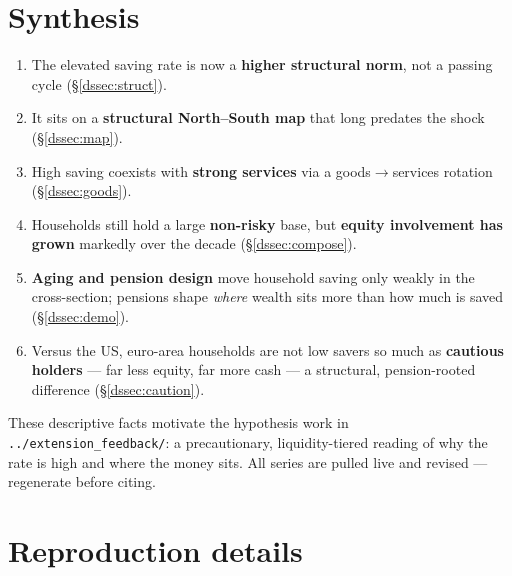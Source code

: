 \documentclass[11pt,a4paper]{article}
\newcommand{\code}[1]{\texttt{#1}}
\begin{document}
\section{Synthesis}\label{dssec:synth}
\begin{enumerate}[label=\arabic*.]
  \item The elevated saving rate is now a \textbf{higher structural norm}, not a
  passing cycle (\S\ref{dssec:struct}).
  \item It sits on a \textbf{structural North--South map} that long predates the
  shock (\S\ref{dssec:map}).
  \item High saving coexists with \textbf{strong services} via a
  goods$\rightarrow$services rotation (\S\ref{dssec:goods}).
  \item Households still hold a large \textbf{non-risky} base, but \textbf{equity
  involvement has grown} markedly over the decade (\S\ref{dssec:compose}).
  \item \textbf{Aging and pension design} move household saving only weakly in the
  cross-section; pensions shape \emph{where} wealth sits more than how much is saved
  (\S\ref{dssec:demo}).
  \item Versus the US, euro-area households are not low savers so much as
  \textbf{cautious holders} --- far less equity, far more cash --- a structural,
  pension-rooted difference (\S\ref{dssec:caution}).
\end{enumerate}
These descriptive facts motivate the hypothesis work in
\code{../extension\_feedback/}: a precautionary, liquidity-tiered reading of why
the rate is high and where the money sits. All series are pulled live and revised
--- regenerate before citing.


\clearpage
\appendix
\section{Reproduction details}
\end{document}
